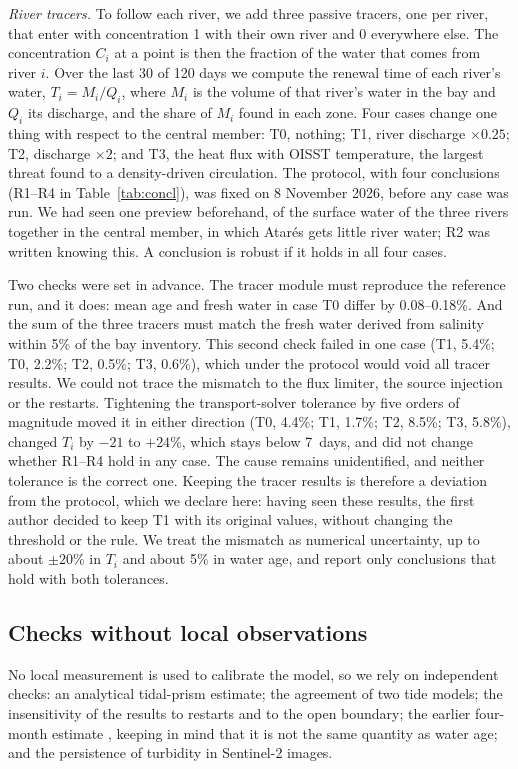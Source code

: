\documentclass[a4paper,fleqn]{ems-dc}
\begin{document}
\emph{River tracers.} To follow each river, we add three passive tracers, one per river,
that enter with concentration 1 with their own river and 0 everywhere else. The
concentration $C_i$ at a point is then the fraction of the water that comes from river $i$.
Over the last 30 of 120 days we compute the renewal time of each river's water,
$T_i = M_i/Q_i$, where $M_i$ is the volume of that river's water in the bay and $Q_i$ its
discharge, and the share of $M_i$ found in each zone. Four cases change one thing with
respect to the central member: T0, nothing; T1, river discharge $\times0.25$; T2, discharge
$\times2$; and T3, the heat flux with OISST temperature, the largest threat found to a
density-driven circulation. The protocol, with four conclusions (R1--R4 in
Table~\ref{tab:concl}), was fixed on 8 November 2026, before any case was run. We had seen
one preview beforehand, of the surface water of the three rivers together in the central
member, in which Atar\'es gets little river water; R2 was written knowing this. A conclusion
is robust if it holds in all four cases.

Two checks were set in advance. The tracer module must reproduce the reference run, and it
does: mean age and fresh water in case T0 differ by 0.08--0.18\%. And the sum of the three
tracers must match the fresh water derived from salinity within 5\% of the bay inventory.
This second check failed in one case (T1, 5.4\%; T0, 2.2\%; T2, 0.5\%; T3, 0.6\%), which
under the protocol would void all tracer results. We could not trace the mismatch to the
flux limiter, the source injection or the restarts. Tightening the transport-solver
tolerance by five orders of magnitude moved it in either direction (T0, 4.4\%; T1, 1.7\%;
T2, 8.5\%; T3, 5.8\%), changed $T_i$ by $-21$ to $+24$\%, which stays below 7~days, and did
not change whether R1--R4 hold in any case. The cause remains unidentified, and neither
tolerance is the correct one. Keeping the tracer results is therefore a deviation from the
protocol, which we declare here: having seen these results, the first author decided to
keep T1 with its original values, without changing the threshold or the rule. We treat the
mismatch as numerical uncertainty, up to about $\pm20$\% in $T_i$ and about 5\% in water
age, and report only conclusions that hold with both tolerances.

\subsection{Checks without local observations}\label{sec:eval}
No local measurement is used to calibrate the model, so we rely on independent checks: an
analytical tidal-prism estimate; the agreement of two tide models; the insensitivity of the
results to restarts and to the open boundary; the earlier four-month estimate
\citep{JICA2004}, keeping in mind that it is not the same quantity as water age; and the
persistence of turbidity in Sentinel-2 images.
\end{document}
